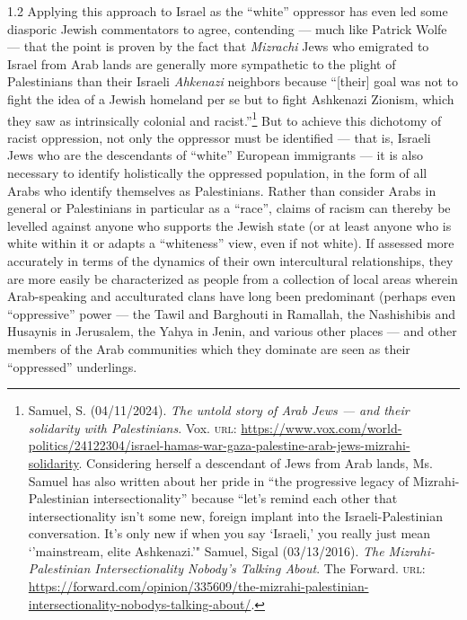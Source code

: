 \documentclass[../unravbook.tex]{subfiles}
\begin{document}
\begin{spacing}{1.2}
Applying this approach to Israel as the ``white'' oppressor has even led some diasporic Jewish commentators to agree, contending --- much like Patrick Wolfe --- that the point is proven by the fact that \textit{Mizrachi} Jews who emigrated to Israel from Arab lands are generally more sympathetic to the plight of Palestinians than their Israeli \textit{Ahkenazi} neighbors because ``[their] goal was not to fight the idea of a Jewish homeland per se but to fight Ashkenazi Zionism, which they saw as intrinsically colonial and racist.''\footnote{Samuel, S. (04/11/2024). \textit{The untold story of Arab Jews — and their solidarity with Palestinians}. Vox. \textsc{url: } \url{https://www.vox.com/world-politics/24122304/israel-hamas-war-gaza-palestine-arab-jews-mizrahi-solidarity}. Considering herself a descendant of Jews from Arab lands, Ms. Samuel has also written about her pride in ``the progressive legacy of Mizrahi-Palestinian intersectionality'' because ``let's remind each other that intersectionality isn't some new, foreign implant into the Israeli-Palestinian conversation. It's only new if when you say `Israeli,' you really just mean `'mainstream, elite Ashkenazi.'"  Samuel, Sigal (03/13/2016). \textit{The Mizrahi-Palestinian Intersectionality Nobody's Talking About}. The Forward. \textsc{url: } \url{https://forward.com/opinion/335609/the-mizrahi-palestinian-intersectionality-nobodys-talking-about/}.} But to achieve this dichotomy of racist oppression, not only the oppressor must be identified --- that is, Israeli Jews who are the descendants of ``white'' European immigrants --- it is also necessary to identify holistically the oppressed population, in the form of all Arabs who identify themselves as Palestinians. Rather than consider Arabs in general or Palestinians in particular as a ``race'', claims of racism can thereby be levelled against anyone who supports the Jewish state (or at least anyone who is white within it or adapts a ``whiteness'' view, even if not white). If assessed more accurately in terms of the dynamics of their own intercultural relationships, they are more easily be characterized as people from a collection of local areas wherein Arab-speaking and acculturated clans have long been predominant (perhaps even ``oppressive'' power --- the Tawil and Barghouti in Ramallah, the Nashishibis and Husaynis in Jerusalem, the Yahya in Jenin, and various other places --- and other members of the Arab communities which they dominate are seen as their ``oppressed'' underlings. 


\end{spacing}
\end{document}
